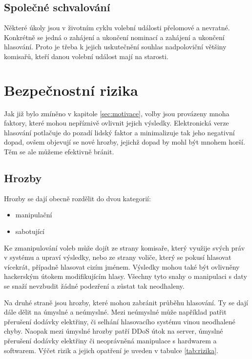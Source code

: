 \documentclass[11pt,twoside,a4paper]{book}
\begin{document}
\subsection{Společné schvalování}

Některé úkoly jsou v životním cyklu volební události přelomové a nevratné. Konkrétně se jedná o zahájení a ukončení nominací a zahájení a ukončení hlasování. Proto je třeba k jejich uskutečnění souhlas nadpoloviční většiny komisařů, kteří danou volební událost mají na starosti.

\section{Bezpečnostní rizika} \label{sec:bezpecnostni_rizika}

Jak již bylo zmíněno v kapitole \ref{sec:motivace}, volby jsou provázeny mnoha faktory, které mohou nepříznivě ovlivnit jejich výsledky. Elektronická verze hlasování potlačuje do pozadí lidský faktor a minimalizuje tak jeho negativní dopad, ovšem objevují se nové hrozby, jejichž dopad by mohl být mnohem horší. Těm se ale můžeme efektivně bránit.

\subsection{Hrozby} \label{sec:hrozby}

Hrozby\cite{book:prosser} se dají obecně rozdělit do dvou kategorií: 

\begin{itemize}
	\item manipulační
	\item sabotující
\end{itemize}	

Ke zmanipulování voleb může dojít ze strany komisaře, který využije svých práv v systému a upraví výsledky, nebo ze strany voliče, který se pokusí hlasovat vícekrát, případně hlasovat cizím jménem. Výsledky mohou také být ovlivněny hackerským útokem modifikujícím hlasy. Všechny tyto snahy o manipulaci s daty se snaží nevzbudit žádné podezření a zůstat tak neodhaleny. 

Na druhé straně jsou hrozby, které mohou zabránit průběhu hlasování. Ty se dají dále dělit na úmyslné a neúmyslné. Mezi neúmyslné může například patřit přerušení dodávky elektřiny, či selhání hlasovacího systému vinou neodhalené chyby. Naopak mezi úmyslné hrozby patří DDoS útok \cite{www:ddos} na server, úmyslné přerušení dodávky elektřiny či neoprávněná manipulace s hardwarem a softwarem. Výčet rizik a jejich opatření je uveden v tabulce \ref{tab:rizika}.
\end{document}
